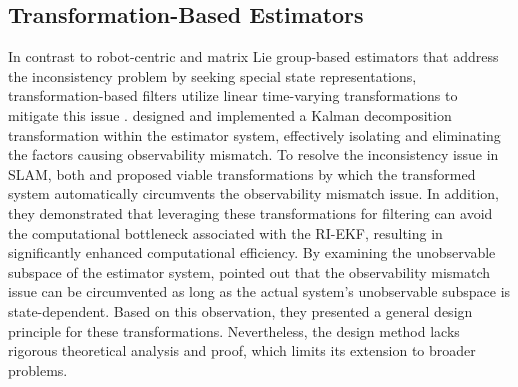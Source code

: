 
\subsection{Transformation-Based Estimators}

In contrast to robot-centric and matrix Lie group-based estimators that address the inconsistency problem by seeking special state representations, transformation-based filters utilize linear time-varying transformations to mitigate this issue \cite{B43, B70, B74, B69}. \cite{B43} designed and implemented a Kalman decomposition transformation within the estimator system, effectively isolating and eliminating the factors causing observability mismatch. To resolve the inconsistency issue in SLAM, both \cite{B70} and \cite{B74} proposed viable transformations by which the transformed system automatically circumvents the observability mismatch issue. In addition, they demonstrated that leveraging these transformations for filtering can avoid the computational bottleneck associated with the RI-EKF, resulting in significantly enhanced computational efficiency. By examining the unobservable subspace of the estimator system, \cite{B69} pointed out that the observability mismatch issue can be circumvented as long as the actual system's unobservable subspace is state-dependent. Based on this observation, they presented a general design principle for these transformations. Nevertheless, the design method lacks rigorous theoretical analysis and proof, which limits its extension to broader problems.



%